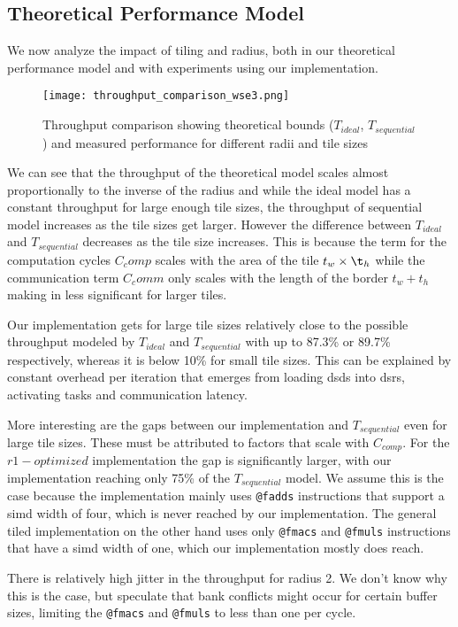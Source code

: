 \subsection{Theoretical Performance Model}
\label{sec:perf_model_validation}
We now analyze the impact of tiling and radius, both in our theoretical performance model and with experiments using our implementation.
\begin{figure}[h]
    \centering
    \texttt{[image: throughput\_comparison\_wse3.png]}
    \caption{Throughput comparison showing theoretical bounds ($T_{ideal}$, $T_{sequential}$) and measured performance for different radii and tile sizes}
    \label{fig:throughput_comparison_wse3}
\end{figure}
We can see that the throughput of the theoretical model scales almost proportionally to the inverse of the radius and while the ideal model has a constant throughput for large enough tile sizes, the throughput of sequential model increases as the tile sizes get larger.
However the difference between $T_{ideal}$ and $T_{sequential}$ decreases as the tile size increases. This is because the term for the computation cycles $C_comp$ scales with the area of the tile $t_w\times\t_h$ while the communication term $C_comm$ only scales with the length of the border $t_w+t_h$ making in less significant for larger tiles.

Our implementation gets for large tile sizes relatively close to the possible throughput modeled by $T_{ideal}$ and $T_{sequential}$ with up to 87.3\% or 89.7\% respectively, whereas it is below 10\% for small tile sizes. This can be explained by constant overhead per iteration that emerges from loading \acp{dsd} into \acp{dsr}, activating tasks and communication latency.


More interesting are the gaps between our implementation and $T_{sequential}$ even for large tile sizes. These must be attributed to factors that scale with $C_{comp}$. For the $r1-optimized$ implementation the gap is significantly larger, with our implementation reaching only 75\% of the $T_{sequential}$ model. We assume this is the case because the implementation mainly uses \texttt{@fadds} instructions that support a \ac{simd} width of four, which is never reached by our implementation. The general tiled implementation on the other hand uses only \texttt{@fmacs} and \texttt{@fmuls} instructions that have a \ac{simd} width of one, which our implementation mostly does reach.

There is relatively high jitter in the throughput for radius 2. We don't know why this is the case, but speculate that bank conflicts might occur for certain buffer sizes, limiting the \texttt{@fmacs} and \texttt{@fmuls} to less than one per cycle.

